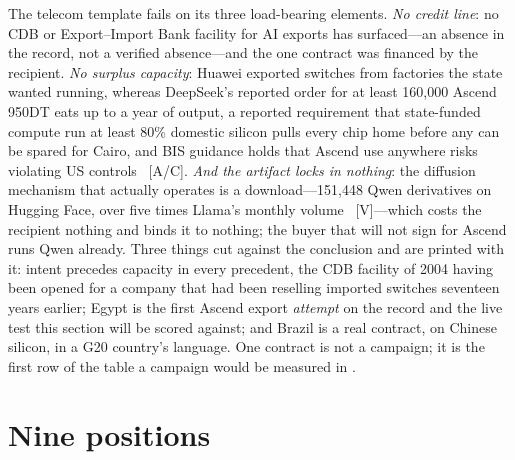 The telecom template fails on its three load-bearing elements. \emph{No credit line}: no CDB or Export--Import Bank facility for AI exports has surfaced---an absence in the record, not a verified absence---and the one contract was financed by the recipient. \emph{No surplus capacity}: Huawei exported switches from factories the state wanted running, whereas DeepSeek's reported order for at least 160,000 Ascend 950DT eats up to a year of output, a reported requirement that state-funded compute run at least 80\% domestic silicon pulls every chip home before any can be spared for Cairo, and BIS guidance holds that Ascend use anywhere risks violating US controls~\cite{deepseek-ascend-order,ascend-supply-ceiling} [A/C]. \emph{And the artifact locks in nothing}: the diffusion mechanism that actually operates is a download---151,448 Qwen derivatives on Hugging Face, over five times Llama's monthly volume~\cite{qwen-derivatives} [V]---which costs the recipient nothing and binds it to nothing; the buyer that will not sign for Ascend runs Qwen already. Three things cut against the conclusion and are printed with it: intent precedes capacity in every precedent, the CDB facility of 2004 having been opened for a company that had been reselling imported switches seventeen years earlier; Egypt is the first Ascend export \emph{attempt} on the record and the live test this section will be scored against; and Brazil is a real contract, on Chinese silicon, in a G20 country's language. One contract is not a campaign; it is the first row of the table a campaign would be measured in  .

\section{Nine positions}

